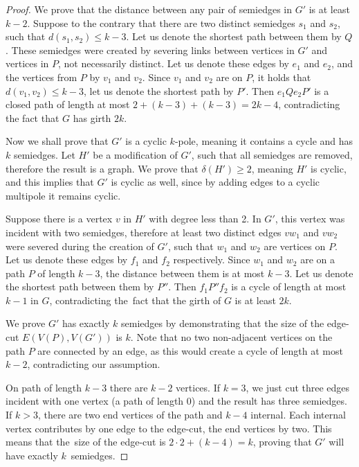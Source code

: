 \documentclass[12pt, twoside]{book}
\begin{document}
\begin{proof}
	We prove that the distance between any pair of semiedges in $G'$ is at least $k-2$. Suppose to the contrary that there are two distinct semiedges $s_1$ and $s_2$, such that ${d(s_1,s_2)\leq k-3}$. Let us denote the shortest path between them by $Q$. These semiedges were created by severing links between vertices in $G'$ and vertices in $P$, not necessarily distinct. Let us denote these edges by $e_1$ and $e_2$, and the vertices from $P$ by $v_1$ and $v_2$. Since $v_1$ and $v_2$ are on $P$, it holds that $d(v_1,v_2)\leq k-3$, let us denote the shortest path by $P'$. Then $e_1Qe_2P'$ is a closed path of length at most $2+(k-3)+(k-3)=2k-4$, contradicting the fact that $G$ has girth $2k$.
	
	Now we shall prove that $G'$ is a cyclic $k$-pole, meaning it contains a cycle and has $k$ semiedges. Let $H'$ be a modification of $G'$, such that all semiedges are removed, therefore the result is a graph. We prove that $\delta(H')\geq 2$, meaning $H'$ is cyclic, and this implies that $G'$ is cyclic as well, since by adding edges to a cyclic multipole it remains cyclic.
	
	Suppose there is a vertex $v$ in $H'$ with degree less than 2. In $G'$, this vertex was incident with two semiedges, therefore at least two distinct edges ${vw_1}$ and ${vw_2}$ were severed during the creation of $G'$, such that $w_1$ and $w_2$ are vertices on $P$. Let us denote these edges by $f_1$ and $f_2$ respectively. Since $w_1$ and $w_2$ are on a path $P$ of length $k-3$, the distance between them is at most $k-3$. Let us denote the shortest path between them by $P''$. Then $f_1P''f_2$ is a cycle of length at most $k-1$ in $G$, contradicting the~fact that the girth of $G$ is at least $2k$.
	
	We prove $G'$ has exactly $k$ semiedges by demonstrating that the size of the edge-cut $E\left(V(P), V(G')\right)$ is $k$. Note that no two non-adjacent vertices on the path $P$ are connected by an edge, as this would create a cycle of length at most $k-2$, contradicting our assumption.
	
	On path of length $k-3$ there are $k-2$ vertices. If $k=3$, we just cut three edges incident with one vertex (a path of length 0) and the result has three semiedges. If $k > 3$, there are two end vertices of the path and $k-4$ internal. Each internal vertex contributes by one edge to the edge-cut, the end vertices by two. This means that the~size of the edge-cut is $2\cdot 2 + (k-4)=k$, proving that $G'$ will have exactly $k$~semiedges.
	

\end{proof}
\end{document}
